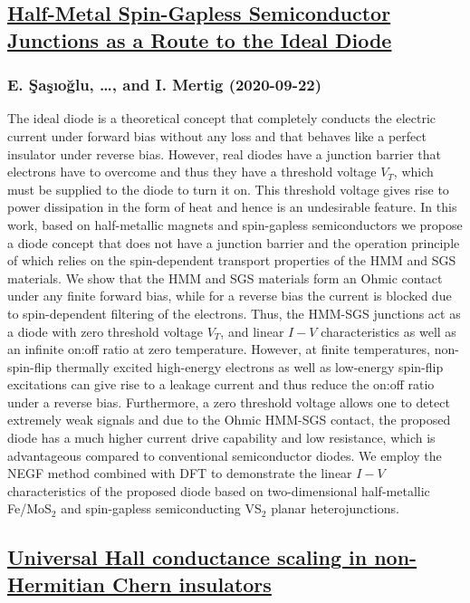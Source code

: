 {\subsection*{\href{http://arxiv.org/abs/2009.10463v1}{Half-Metal Spin-Gapless Semiconductor Junctions as a Route to the Ideal  Diode}}
\subsubsection*{E. Şaşıoğlu, \dots, and I. Mertig (2020-09-22)}
The ideal diode is a theoretical concept that completely conducts the
electric current under forward bias without any loss and that behaves like a
perfect insulator under reverse bias. However, real diodes have a junction
barrier that electrons have to overcome and thus they have a threshold voltage
$V_T$, which must be supplied to the diode to turn it on. This threshold
voltage gives rise to power dissipation in the form of heat and hence is an
undesirable feature. In this work, based on half-metallic magnets and
spin-gapless semiconductors we propose a diode concept that does not have a
junction barrier and the operation principle of which relies on the
spin-dependent transport properties of the HMM and SGS materials. We show that
the HMM and SGS materials form an Ohmic contact under any finite forward bias,
while for a reverse bias the current is blocked due to spin-dependent filtering
of the electrons. Thus, the HMM-SGS junctions act as a diode with zero
threshold voltage $V_T$, and linear $I-V$ characteristics as well as an
infinite on:off ratio at zero temperature. However, at finite temperatures,
non-spin-flip thermally excited high-energy electrons as well as low-energy
spin-flip excitations can give rise to a leakage current and thus reduce the
on:off ratio under a reverse bias. Furthermore, a zero threshold voltage allows
one to detect extremely weak signals and due to the Ohmic HMM-SGS contact, the
proposed diode has a much higher current drive capability and low resistance,
which is advantageous compared to conventional semiconductor diodes. We employ
the NEGF method combined with DFT to demonstrate the linear $I-V$
characteristics of the proposed diode based on two-dimensional half-metallic
Fe/MoS$_2$ and spin-gapless semiconducting VS$_2$ planar heterojunctions.

\subsection*{\href{http://arxiv.org/abs/2009.10455v1}{Universal Hall conductance scaling in non-Hermitian Chern insulators}}
}
